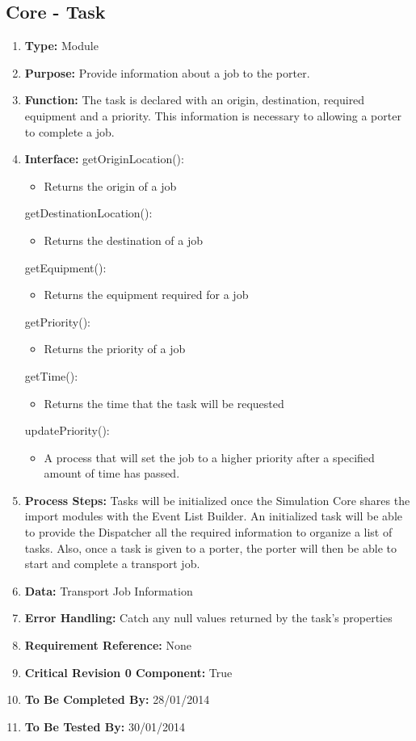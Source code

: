 \documentclass[paper=letter, fontsize=10pt]{scrartcl}
\numberwithin{equation}{section}		%
\numberwithin{figure}{section}			%
\numberwithin{table}{section}				%
\begin{document}
\subsection{Core - Task}
\begin{enumerate}[]
	\item \textbf{Type:} Module
	\item \textbf{Purpose:} Provide information about a job to the porter.
	\item \textbf{Function:} The task is declared with an origin, destination, required equipment and a priority.  This information is necessary to allowing a porter to complete a job.
	\item \textbf{Interface:} \newline
		getOriginLocation():
			\begin{itemize}
				\item Returns the origin of a job
			\end{itemize}
		getDestinationLocation():
			\begin{itemize}
				\item Returns the destination of a job
			\end{itemize}
		getEquipment():
			\begin{itemize}
				\item Returns the equipment required for a job
			\end{itemize}
		getPriority():
			\begin{itemize}
				\item Returns the priority of a job
			\end{itemize}
		getTime():
			\begin{itemize}
				\item Returns the time that the task will be requested
			\end{itemize}			
		updatePriority():
			\begin{itemize}
				\item A process that will set the job to a higher priority after a specified amount of time has passed.
			\end{itemize}
	\item \textbf{Process Steps:}  Tasks will be initialized once the Simulation Core shares the import modules with the Event List Builder.  An initialized task will be able to provide the Dispatcher all the required information to organize a list of tasks.  Also, once a task is given to a porter, the porter will then be able to start and complete a transport job.
	\item \textbf{Data:} Transport Job Information
	\item \textbf{Error Handling:} Catch any null values returned by the task's properties
	\item \textbf{Requirement Reference:} None
	\item \textbf{Critical Revision 0 Component:} True
	\item \textbf{To Be Completed By:} 28/01/2014
	\item \textbf{To Be Tested By:} 30/01/2014
\end{enumerate}
\end{document}
